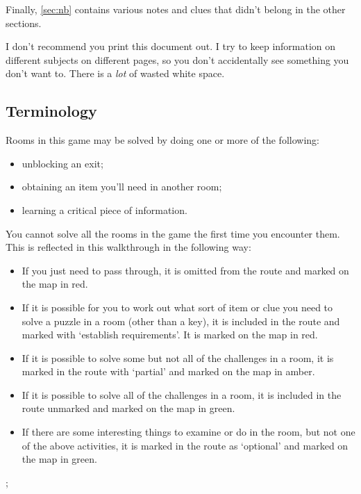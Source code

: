 \documentclass[a5paper]{extarticle}
\begin{document}
Finally, \cref{sec:nb} contains various notes and clues that didn't belong
in the other sections.

I don't recommend you print this document out.
I try to keep information on different subjects on different pages,
so you don't accidentally see something you don't want to.
There is a \emph{lot} of wasted white space.

\newpage
\subsection{Terminology}\label{sec:terms}

Rooms in this game may be solved by doing one or more of the following:

\begin{itemize}
\item
  unblocking an exit;
\item
  obtaining an item you'll need in another room;
\item
  learning a critical piece of information.
\end{itemize}

You cannot solve all the rooms in the game the first time you encounter them.
This is reflected in this walkthrough in the following way:

\begin{itemize}
\item
  If you just need to pass through, it is omitted from the route and marked
  on the map in red.
\item
  If it is possible for you to work out what sort of item or clue you need to
  solve a puzzle in a room (other than a key), it is included in the route
  and marked with ‘establish requirements’. It is marked on the map in red.
\item
  If it is possible to solve some but not all of the challenges in a room,
  it is marked in the route with ‘partial’ and marked on the map in amber.
\item
  If it is possible to solve all of the challenges in a room, it is included
  in the route unmarked and marked on the map in green.
\item
  If there are some interesting things to examine or do in the room, but not
  one of the above activities, it is marked in the route as ‘optional’ and
  marked on the map in green.
\end{itemize}

\bigskip
\begin{adjustbox}{center}
\sffamily
\begin{gamemap}[set grid={10em}{6em}]
;
\end{gamemap}
\end{adjustbox}
\end{document}
